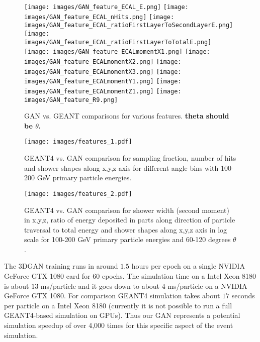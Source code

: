 \begin{figure}
    \centering
    \texttt{[image: images/GAN\_feature\_ECAL\_E.png]}
    \texttt{[image: images/GAN\_feature\_ECAL\_nHits.png]}
    \texttt{[image: images/GAN\_feature\_ECAL\_ratioFirstLayerToSecondLayerE.png]}
    \texttt{[image: images/GAN\_feature\_ECAL\_ratioFirstLayerToTotalE.png]}
    \texttt{[image: images/GAN\_feature\_ECALmomentX1.png]}
    \texttt{[image: images/GAN\_feature\_ECALmomentX2.png]}
    \texttt{[image: images/GAN\_feature\_ECALmomentX3.png]}
    \texttt{[image: images/GAN\_feature\_ECALmomentY1.png]}
    \texttt{[image: images/GAN\_feature\_ECALmomentZ1.png]}
    \texttt{[image: images/GAN\_feature\_R9.png]}
    \caption{GAN vs. GEANT comparisons for various features. {\bf theta should be $\theta$.}
    \label{fig:GAN_features}}
\end{figure}
\fi
\begin{figure}
    \centering
    \texttt{[image: images/features\_1.pdf]}
    \caption{GEANT4 vs. GAN comparison for sampling fraction, number
      of hits and shower shapes along x,y,z axis for different angle
      bins with 100-200 GeV primary particle energies.
      \label{fig:GAN_features1}}
\end{figure}

\begin{figure}
    \centering
    \texttt{[image: images/features\_2.pdf]}
    \caption{GEANT4 vs. GAN comparison for shower width (second
      moment) in x,y,z, ratio of energy deposited in parts along
      direction of particle traversal to total energy and shower
      shapes along x,y,z axis in log scale for 100-200 GeV primary
      particle energies and 60-120 degrees $\theta$.
      \label{fig:GAN_features2}}
\end{figure}

The 3DGAN training runs in around $1.5$ hours per epoch on a single NVIDIA GeForce GTX 1080 card for $60$ epochs. The simulation  time  on a Intel  Xeon 8180  is about $13$ ms/particle  and it goes down to about $4$ ms/particle on a NVIDIA  GeForce  GTX  1080. For  comparison  GEANT4  simulation takes  about $17$ seconds  per  particle on  a  Intel  Xeon  8180 (currently  it  is  not  possible  to  run a full  GEANT4-based  simulation  on  GPUs). Thus our GAN represents a potential simulation speedup of over 4,000 times for this specific aspect of the event simulation.


